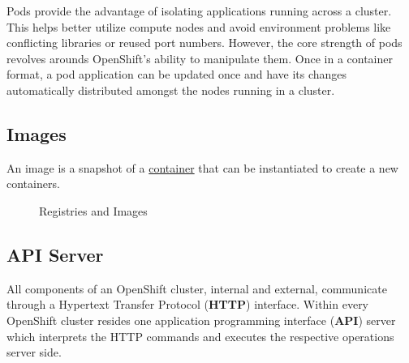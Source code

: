 \documentclass{article}
\begin{document}
Pods provide the advantage of isolating applications running across a cluster. This helps
better utilize compute nodes and avoid environment problems like conflicting libraries or reused
port numbers. However, the core strength of pods revolves arounds OpenShift's ability to manipulate them.
Once in a container format, a pod application can be updated once and have its changes automatically distributed 
amongst the nodes running in a cluster.                                                         

\subsection{Images}

An image is a snapshot of a \href{https://kyguy.github.io/src/containers/containers.html}{container} that can be instantiated
to create a new containers. 

\begin{figure}
\caption{Registries and Images}
\end{figure}

\subsection{API Server}

All components of an OpenShift cluster, internal and external, communicate through a Hypertext 
Transfer Protocol (\textbf{HTTP}) interface. Within every OpenShift cluster resides one application programming 
interface (\textbf{API}) server which interprets the HTTP commands and executes the respective 
operations server side. 
\end{document}

